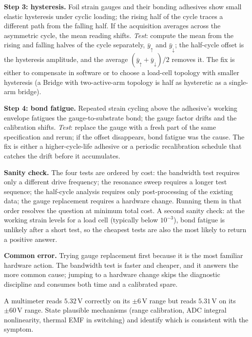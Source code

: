 \textbf{Step 3: hysteresis.} Foil strain gauges and their bonding
adhesives show small elastic hysteresis under cyclic loading; the
rising half of the cycle traces a different path from the falling
half. If the acquisition averages across the asymmetric cycle,
the mean reading shifts.
\emph{Test}: compute the mean from the rising and falling halves
of the cycle separately, $\bar y_{\uparrow}$ and $\bar y_{\downarrow}$;
the half-cycle offset is the hysteresis amplitude, and the
average $(\bar y_{\uparrow} + \bar y_{\downarrow})/2$ removes it.
The fix is either to compensate in software or to choose a
load-cell topology with smaller hysteresis (a Bridge with
two-active-arm topology is half as hysteretic as a single-arm
bridge).

\textbf{Step 4: bond fatigue.} Repeated strain cycling above the
adhesive's working envelope fatigues the gauge-to-substrate bond;
the gauge factor drifts and the calibration shifts.
\emph{Test}: replace the gauge with a fresh part of the same
specification and rerun; if the offset disappears, bond fatigue
was the cause. The fix is either a higher-cycle-life adhesive
or a periodic recalibration schedule that catches the drift
before it accumulates.

\textbf{Sanity check.} The four tests are ordered by cost: the
bandwidth test requires only a different drive frequency; the
resonance sweep requires a longer test sequence; the half-cycle
analysis requires only post-processing of the existing data; the
gauge replacement requires a hardware change. Running them in
that order resolves the question at minimum total cost. A second
sanity check: at the working strain levels for a load cell
(typically below $10^{-3}$), bond fatigue is unlikely after a
short test, so the cheapest tests are also the most likely to
return a positive answer.

\textbf{Common error.} Trying gauge replacement first because it
is the most familiar hardware action. The bandwidth test is faster
and cheaper, and it answers the more common cause; jumping to a
hardware change skips the diagnostic discipline and consumes
both time and a calibrated spare.

\begin{exercise}
A multimeter reads $5.32 \,\si{\volt}$ correctly on its
$\pm 6 \,\si{\volt}$ range but reads $5.31 \,\si{\volt}$ on its
$\pm 60 \,\si{\volt}$ range. State plausible mechanisms (range
calibration, ADC integral nonlinearity, thermal EMF in switching)
and identify which is consistent with the symptom.
\end{exercise}


